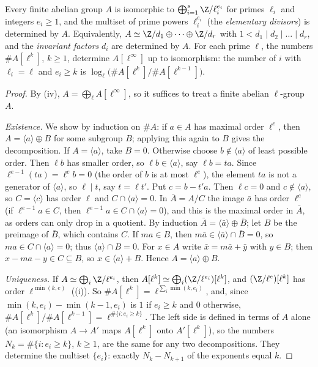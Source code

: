 \begin{theorem}\label{thm:groups:finiteabelian}
Every finite abelian group $A$ is isomorphic to $\bigoplus_{i=1}^s\Z/\ell_i^{e_i}$ for primes $\ell_i$ and integers $e_i\ge1$, and the multiset of prime
powers $\ell_i^{e_i}$ (the \emph{elementary divisors}) is determined by $A$. Equivalently, $A\simeq\Z/d_1\oplus\dots\oplus\Z/d_r$ with
$1<d_1\mid d_2\mid\dots\mid d_r$, and the \emph{invariant factors} $d_i$ are determined by $A$. For each prime $\ell$, the numbers $\#A[\ell^k]$, $k\ge1$,
determine $A[\ell^\infty]$ up to isomorphism: the number of $i$ with $\ell_i=\ell$ and $e_i\ge k$ is $\log_\ell\bigl(\#A[\ell^k]/\#A[\ell^{k-1}]\bigr)$.
\end{theorem}

\begin{proof}
By (iv), $A=\bigoplus_\ell A[\ell^\infty]$, so it suffices to treat a finite abelian $\ell$-group $A$.

\emph{Existence.} We show by induction on $\#A$: if $a\in A$ has maximal order $\ell^e$, then $A=\langle a\rangle\oplus B$ for some subgroup $B$; applying
this again to $B$ gives the decomposition. If $A=\langle a\rangle$, take $B=0$. Otherwise choose $b\notin\langle a\rangle$ of least possible order. Then $\ell b$ has smaller
order, so $\ell b\in\langle a\rangle$, say $\ell b=ta$. Since $\ell^{e-1}(ta)=\ell^eb=0$ (the order of $b$ is at most $\ell^e$), the element $ta$ is not a generator of
$\langle a\rangle$, so $\ell\mid t$, say $t=\ell t'$. Put $c=b-t'a$. Then $\ell c=0$ and $c\notin\langle a\rangle$, so $C=\langle c\rangle$ has order $\ell$ and
$C\cap\langle a\rangle=0$. In $\bar A=A/C$ the image $\bar a$ has order $\ell^e$ (if $\ell^{e-1}a\in C$, then $\ell^{e-1}a\in C\cap\langle a\rangle=0$), and this is the maximal
order in $\bar A$, as orders can only drop in a quotient. By induction $\bar A=\langle\bar a\rangle\oplus\bar B$; let $B$ be the preimage of $\bar B$, which contains $C$.
If $ma\in B$, then $m\bar a\in\langle\bar a\rangle\cap\bar B=0$, so $ma\in C\cap\langle a\rangle=0$; thus $\langle a\rangle\cap B=0$. For $x\in A$ write $\bar x=m\bar a+\bar y$ with $y\in B$; then
$x-ma-y\in C\subseteq B$, so $x\in\langle a\rangle+B$. Hence $A=\langle a\rangle\oplus B$.

\emph{Uniqueness.} If $A\simeq\bigoplus_i\Z/\ell^{e_i}$, then $A[\ell^k]\simeq\bigoplus_i(\Z/\ell^{e_i})[\ell^k]$, and $(\Z/\ell^e)[\ell^k]$ has order $\ell^{\min(k,e)}$
((i)). So $\#A[\ell^k]=\ell^{\sum_i\min(k,e_i)}$, and, since $\min(k,e_i)-\min(k-1,e_i)$ is $1$ if $e_i\ge k$ and $0$ otherwise,
$\#A[\ell^k]/\#A[\ell^{k-1}]=\ell^{\#\{i:e_i\ge k\}}$. The left side is defined in terms of $A$ alone (an isomorphism $A\to A'$ maps $A[\ell^k]$ onto
$A'[\ell^k]$), so the numbers $N_k=\#\{i:e_i\ge k\}$, $k\ge1$, are the same for any two decompositions. They determine the multiset $\{e_i\}$: exactly
$N_k-N_{k+1}$ of the exponents equal $k$.


\end{proof}

